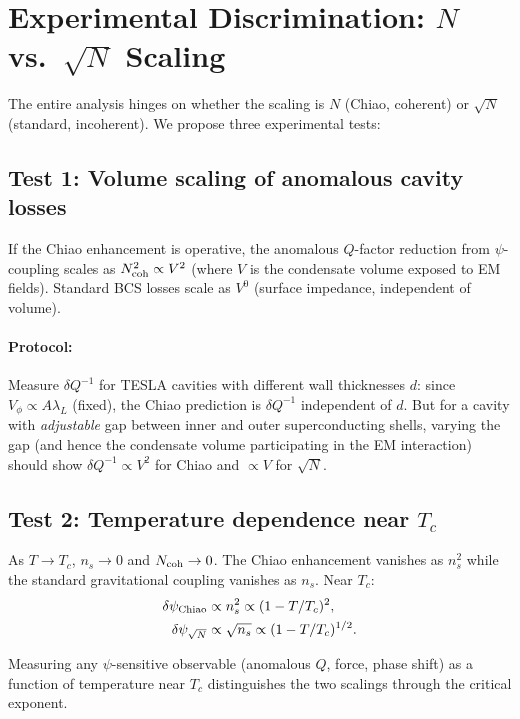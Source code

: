 \documentclass[12pt,aps,prd,twocolumn,superscriptaddress,nofootinbib]{revtex4-2}
\begin{document}
\section{Experimental Discrimination: $N$ vs.\ $\sqrt{N}$ Scaling}
\label{sec:experimental-test}

The entire analysis hinges on whether the scaling is $N$ (Chiao,
coherent) or $\sqrt{N}$ (standard, incoherent). We propose three
experimental tests:

\subsection{Test 1: Volume scaling of anomalous cavity losses}

If the Chiao enhancement is operative, the anomalous $Q$-factor
reduction from $\psi$-coupling scales as $N_{\rm coh}^2 \propto V^2$
(where $V$ is the condensate volume exposed to EM fields). Standard
BCS losses scale as $V^0$ (surface impedance, independent of volume).

\paragraph{Protocol:} Measure $\delta Q^{-1}$ for TESLA cavities with
different wall thicknesses $d$: since $V_\phi \propto A\lambda_L$
(fixed), the Chiao prediction is $\delta Q^{-1}$ independent of $d$.
But for a cavity with \emph{adjustable} gap between inner and outer
superconducting shells, varying the gap (and hence the condensate
volume participating in the EM interaction) should show $\delta Q^{-1}
\propto V^2$ for Chiao and $\propto V$ for $\sqrt{N}$.

\subsection{Test 2: Temperature dependence near $T_c$}

As $T \to T_c$, $n_s \to 0$ and $N_{\rm coh} \to 0$. The Chiao
enhancement vanishes as $n_s^2$ while the standard gravitational
coupling vanishes as $n_s$. Near $T_c$:
\begin{align}
\delta\psi_{\rm Chiao} &\propto n_s^2 \propto (1 - T/T_c)^2, \\
\delta\psi_{\sqrt{N}} &\propto \sqrt{n_s} \propto (1 - T/T_c)^{1/2}.
\end{align}

Measuring any $\psi$-sensitive observable (anomalous $Q$, force,
phase shift) as a function of temperature near $T_c$ distinguishes
the two scalings through the critical exponent.
\end{document}
